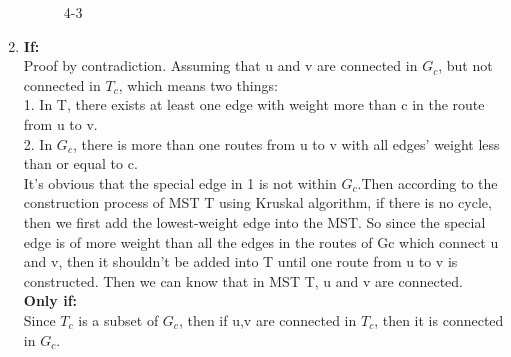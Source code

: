 \documentclass[12pt, notitlepage]{article}
\begin{document}
\begin{enumerate}
\begin{figure}[H]
	\caption{4-3} \nonumber\label{fig:4-3}\vspace{-10pt}
    \end{figure}
	\item
	\textbf{If:}\\
	Proof by contradiction. Assuming that u and v are connected in $G_c$, but not connected in $T_c$, which means two things:\\
	1. In T, there exists at least one edge with weight more than c in the route from u to v. \\
	2. In $G_c$, there is more than one routes from u to v with all edges' weight less than or equal to c.\\
	It's obvious that the special edge in 1 is not within $G_c$.Then according to the construction process of MST T using Kruskal algorithm,  if there is no cycle, then we first add the lowest-weight edge into the MST. So since the special edge is of more weight than all the edges in the routes of Gc which connect u and v, then it shouldn't be added into T until one route from u to v is constructed. Then we can know that in MST T, u and v are connected.\\
	\textbf{Only if:}\\
	Since $T_c$ is a subset of $G_c$, then if u,v are connected in $T_c$, then it is connected in $G_c$.
\end{enumerate}
\end{document}
